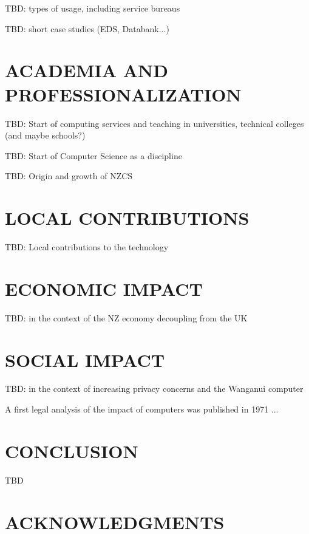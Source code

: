 \documentclass{IEEEcsmag}
\begin{document}
TBD: types of usage, including service bureaus

TBD: short case studies (EDS, Databank...)

\vspace*{-8pt}
\section{ACADEMIA AND PROFESSIONALIZATION}

TBD: Start of computing services and teaching in universities, technical colleges (and maybe schools?)

TBD: Start of Computer Science as a discipline

TBD: Origin and growth of NZCS

\vspace*{-8pt}
\section{LOCAL CONTRIBUTIONS}

 TBD: Local contributions to the technology 

\vspace*{-8pt}
\section{ECONOMIC IMPACT}

TBD: in the context of the NZ economy decoupling from the UK

\vspace*{-8pt}
\section{SOCIAL IMPACT}

TBD: in the context of increasing privacy concerns and the Wanganui computer

A first legal analysis of the impact of computers was published in 1971 \cite{Auburn1971}...

\vspace*{-8pt}
\section{CONCLUSION}

TBD

\vspace*{-8pt}
\section{ACKNOWLEDGMENTS}
\end{document}
